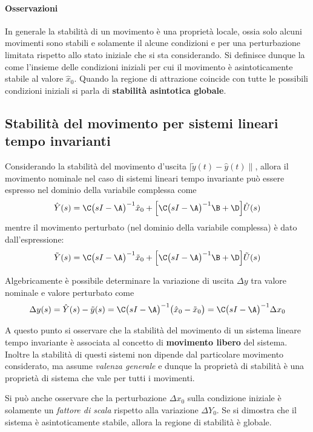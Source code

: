 	\paragraph{Osservazioni} In generale la stabilità di un movimento è una proprietà locale, ossia solo alcuni movimenti sono stabili e solamente il alcune condizioni e per una perturbazione limitata rispetto allo stato iniziale che si sta considerando. Si definisce dunque la  come l'insieme delle condizioni iniziali per cui il movimento è asintoticamente stabile al valore $\hat x_0$. Quando la regione di attrazione coincide con tutte le possibili condizioni iniziali si parla di \textbf{stabilità asintotica globale}.
			
			
	\subsection{Stabilità del movimento per sistemi lineari tempo invarianti}
		Considerando la stabilità del movimento d'uscita $|\tilde y(t) - \hat y(t)\|$, allora il movimento nominale nel caso di sistemi lineari tempo invariante può essere espresso nel dominio della variabile complessa come
		\[\hat Y(s) = \C\big(sI - \A\big)^{-1}\hat x_0 + \Big[ \C \big(sI-\A\big)^{-1} \B + \D \Big] \hat U(s) \]
		mentre il movimento perturbato (nel dominio della variabile complessa) è dato dall'espressione:
		\[\tilde  Y(s) = \C\big(sI - \A\big)^{-1}\tilde x_0 + \Big[ \C \big(sI-\A\big)^{-1} \B + \D \Big] \tilde U(s) \] 
		
		Algebricamente è possibile determinare la variazione di uscita $\Delta y$ tra valore nominale e valore perturbato come
		\[ \Delta y(s) = \hat Y(s) - \tilde y(s) = \C \big(sI-\A\big)^{-1} \big(\hat x_0 - \tilde x_0\big) = \C \big(sI-\A\big)^{-1} \Delta x_0   \]
		
		A questo punto si osservare che la stabilità del movimento di un sistema lineare tempo invariante è associata al concetto di \textbf{movimento libero} del sistema. Inoltre la stabilità di questi sistemi non dipende dal particolare movimento considerato, ma assume \textit{valenza generale} e dunque la proprietà di stabilità è una proprietà di sistema che vale per tutti i movimenti.
		
		Si può anche osservare che la perturbazione $\Delta x_0$ sulla condizione iniziale è solamente un \textit{fattore di scala} rispetto alla variazione $\Delta Y_0$. Se si dimostra che il sistema è asintoticamente stabile, allora la regione di stabilità è globale.
		
